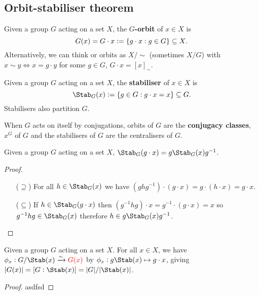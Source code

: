 \documentclass[../Year2.tex]{subfiles}
\begin{document}
\subsection{Orbit-stabiliser theorem}

\begin{definition}[Orbit]
    Given a group $G$ acting on a set $X$, the \textbf{$G$-orbit} of $x\in X$ is \[
        G(x)=G\cdot x:=\{g\cdot x:g\in G\} \subseteq X
    \text{\textcolor{black}{.}}
    \] Alternatively, we can think or orbits as $X/\sim$ (sometimes $X/G$) with $x\sim y\iff x=g\cdot y$ for some $g\in G$, $G\cdot x=[x]_\sim$.
\end{definition}

\begin{definition}[Stabiliser]
    Given a group $G$ acting on a set $X$, the \textbf{stabiliser} of $x\in X$ is \[
        \Stab_G(x):= \{g\in G: g\cdot x = x\} \subseteq G
        \black{.}
        \] Stabilisers also partition $G$.
    \end{definition}
    
\begin{remark}
    When $G$ acts on itself by conjugations, orbits of $G$ are the \textbf{conjugacy classes}, $x^G$ of $G$ and the stabilisers of $G$ are the centralisers of $G$.
\end{remark}

\begin{lemma}
    Given a group $G$ acting on a set $X$, $\Stab_G(g\cdot x)=g\Stab_G(x)g^{-1}$.\begin{proof}
        \begin{enumerate}
            \item[($\supseteq$)] For all $h\in\Stab_G(x)$ we have $(ghg^{-1})\cdot(g\cdot x) = g\cdot (h\cdot x) = g\cdot x$.
            \item[($\subseteq$)]  If $h\in\Stab_G(g\cdot x)$ then $(g^{-1}hg)\cdot x = g^{-1}\cdot(g\cdot x)=x$ so $g^{-1}hg\in\Stab_G(x) $ therefore $ h\in g\Stab_G(x)g^{-1}$.
        \end{enumerate}
    \end{proof}
\end{lemma}

\begin{theorem}
    Given a group $G$ acting on a set $X$. For all $x\in X$, we have $\phi_x:G/\Stab(x)\xrightarrow{\sim}\textcolor{red}{G(x)}$ by $\phi_x:g\Stab(x)\mapsto g\cdot x$, giving $|G(x)| = [G:\Stab(x)] = |G|/|\Stab(x)|$.
    \begin{proof}
        asdfsd
    \end{proof}
\end{theorem}
\end{document}

